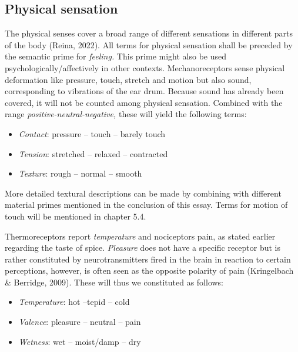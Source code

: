 \vfill

\subsection{Physical sensation}

The physical senses cover a broad range of different sensations in different parts of the body (Reina, 2022). All terms for physical sensation shall be preceded by the semantic prime for \textit{feeling.} This prime might also be used psychologically/affectively in other contexts. Mechanoreceptors sense physical deformation like pressure, touch, stretch and motion but also sound, corresponding to vibrations of the ear drum. Because sound has already been covered, it will not be counted among physical sensation. Combined with the range \textit{positive-neutral-negative,} these will yield the following terms:  

\begin{itemize}
\item   \textit{Contact}: pressure – touch – barely touch  

\item   \textit{Tension}: stretched – relaxed – contracted  

\item   \textit{Texture}: rough – normal – smooth 
\end{itemize}

More detailed textural descriptions can be made by combining with different material primes mentioned in the conclusion of this essay. Terms for motion of touch will be mentioned in chapter 5.4.  

Thermoreceptors report \textit{temperature} and nociceptors pain, as stated earlier regarding the taste of spice. \textit{Pleasure} does not have a specific receptor but is rather constituted by neurotransmitters fired in the brain in reaction to certain perceptions, however, is often seen as the opposite polarity of pain (Kringelbach \& Berridge, 2009). These will thus we constituted as follows:  


\begin{itemize}
\item   \textit{Temperature}: hot –tepid – cold  

\item   \textit{Valence}: pleasure – neutral – pain  

\item   \textit{Wetness}: wet – moist/damp – dry 
\end{itemize}

